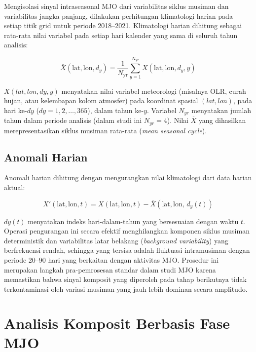 \documentclass[12pt,a4paper]{report}
\begin{document}
 Mengisolasi sinyal intraseasonal MJO dari variabilitas siklus musiman
dan variabilitas jangka panjang, dilakukan perhitungan klimatologi harian pada
setiap titik grid untuk periode 2018--2021. Klimatologi harian dihitung sebagai
rata-rata nilai variabel pada setiap hari kalender yang sama di seluruh tahun
analisis:
 
\begin{equation}
  \bar{X}(\mathrm{lat}, \mathrm{lon}, d_y) =
  \frac{1}{N_{\mathrm{yr}}} \sum_{y=1}^{N_{\mathrm{yr}}}
  X(\mathrm{lat}, \mathrm{lon}, d_y, y)
  \label{eq:climatology}
\end{equation}
 
\noindent
$X(lat, lon, dy, y)$ menyatakan nilai variabel meteorologi
(misalnya OLR, curah hujan, atau kelembapan kolom atmosfer) pada koordinat
spasial $(lat, lon)$, pada hari ke-$dy$ ($dy = 1, 2, \ldots, 365$), dalam tahun ke-$y$. Variabel
$N_{yr}$ menyatakan jumlah tahun dalam periode analisis (dalam studi ini
$N_{yr} = 4$). Nilai $\overline{X}$ yang dihasilkan merepresentasikan siklus
musiman rata-rata (\textit{mean seasonal cycle}).
 
\subsection{Anomali Harian}
 
Anomali harian dihitung dengan mengurangkan nilai klimatologi dari data harian
aktual:
 
\begin{equation}
  X'(\mathrm{lat}, \mathrm{lon}, t) =
  X(\mathrm{lat}, \mathrm{lon}, t) -
  \bar{X}(\mathrm{lat}, \mathrm{lon},\, d_y(t))
  \label{eq:anomaly}
\end{equation}
 
$dy(t)$ menyatakan indeks hari-dalam-tahun yang
bersesuaian dengan waktu $t$. Operasi pengurangan ini secara efektif
menghilangkan komponen siklus musiman deterministik dan variabilitas latar
belakang (\textit{background variability}) yang berfrekuensi rendah, sehingga
yang tersisa adalah fluktuasi intramusiman dengan periode 20--90 hari yang
berkaitan dengan aktivitas MJO. Prosedur ini merupakan langkah
pra-pemrosesan standar dalam studi MJO \cite{Wheeler2004, Kiladis2014}
karena memastikan bahwa sinyal komposit yang diperoleh pada tahap berikutnya
tidak terkontaminasi oleh variasi musiman yang jauh lebih dominan secara
amplitudo.
 
\section{Analisis Komposit Berbasis Fase MJO}
 
\end{document}
